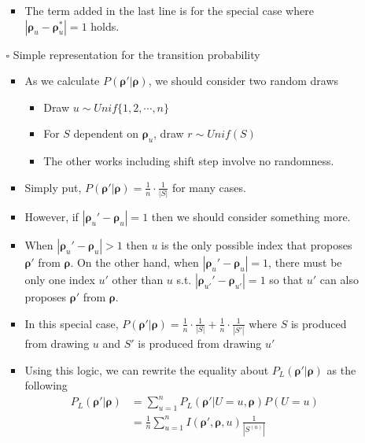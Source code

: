 \documentclass[12pt]{article}
\newcommand{\sq}{$\square$}
\begin{document}
\begin{itemize}
\begin{itemize}
\begin{itemize}
            \item The term added in the last line is for the special case where $ |\boldsymbol{\rho}_u-\boldsymbol{\rho}_u^*|=1$ holds.
        \end{itemize}
        \item[\sq] Simple representation for the transition probability
        \begin{itemize}
            \item As we calculate $P(\boldsymbol{\rho}'|\boldsymbol{\rho})$, we should consider two random draws
            \begin{itemize}
                \item Draw $u\sim Unif\{1,2,\cdots, n\}$
                \item For $S$ dependent on $\boldsymbol{\rho}_u$, draw $r\sim Unif(S)$
                \item The other works including shift step involve no randomness.
            \end{itemize}
            \item Simply put, $P(\boldsymbol{\rho}'|\boldsymbol{\rho})=\frac{1}{n}\cdot\frac{1}{|S|}$ for many cases.
            \item However, if $|\boldsymbol{\rho}_u'-\boldsymbol{\rho}_u|=1$ then we should consider something more. 
            \item When $|\boldsymbol{\rho}_u'-\boldsymbol{\rho}_u|>1$ then $u$ is the only possible index that proposes $\boldsymbol{\rho}'$ from $\boldsymbol{\rho}$. On the other hand, when $|\boldsymbol{\rho}_u'-\boldsymbol{\rho}_u|=1$, there must be only one index $u'$ other than $u$ s.t. $|\boldsymbol{\rho}_{u'}'-\boldsymbol{\rho}_{u'}|=1$ so that $u'$ can also proposes $\boldsymbol{\rho}'$ from $\boldsymbol{\rho}$.
            \item In this special case, $P(\boldsymbol{\rho}'|\boldsymbol{\rho})=\frac{1}{n}\cdot\frac{1}{|S|}+\frac{1}{n}\cdot\frac{1}{|S'|}$ where $S$ is produced from drawing $u$ and $S'$ is produced from drawing $u'$
            \item Using this logic, we can rewrite the equality about $P_L(\boldsymbol{\rho}'|\boldsymbol{\rho})$ as the following 
            \begin{align*}
                P_L(\boldsymbol{\rho}'|\boldsymbol{\rho}) &= \sum_{u=1}^n P_L(\boldsymbol{\rho}'|U=u, \boldsymbol{\rho})P(U=u) \\ &= \frac{1}{n}\sum_{u=1}^n I(\boldsymbol{\rho}', \boldsymbol{\rho}, u) \frac{1}{|S^{(u)}|}
            \end{align*}

\end{itemize}
\end{itemize}
\end{itemize}
\end{document}
